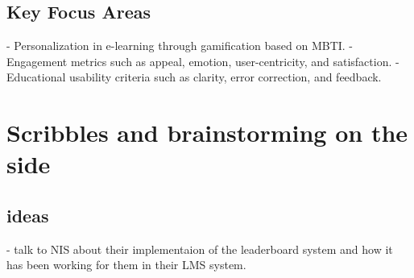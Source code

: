 \documentclass{article}
\begin{document}
\subsection{Key Focus Areas}
- Personalization in e-learning through gamification based on MBTI.
- Engagement metrics such as appeal, emotion, user-centricity, and satisfaction.
- Educational usability criteria such as clarity, error correction, and feedback.


\newpage
\section{Scribbles and brainstorming on the side}

\subsection{ideas}
- talk to NIS about their implementaion of the leaderboard system and how it has been working for them in their LMS system.
\end{document}
